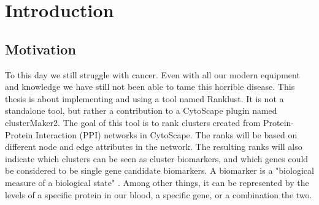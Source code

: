 \part{Introduction}
\label{pa:intro}

\chapter{Motivation}
To this day we still struggle with cancer. Even with all our modern equipment
and knowledge we have still not been able to tame this horrible disease. This
thesis is about implementing and using a tool named Ranklust. It is not a
standalone tool, but rather a contribution to a CytoScape plugin named
clusterMaker2\cite{cm2}\cite{cm2-github}. The goal of this tool is to rank
clusters created from Protein-Protein Interaction (PPI) networks in CytoScape.
The ranks will be based on different node and edge attributes in the network.
The resulting ranks will also indicate which clusters can be seen as cluster
biomarkers, and which genes could be considered to be single gene candidate
biomarkers. A biomarker is a "biological measure of a biological state"
\cite{biomarker1}. Among other things, it can be represented by the levels of
a specific protein in our blood, a specific gene, or a combination the two.

